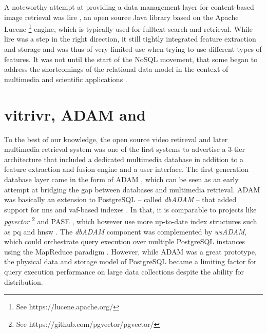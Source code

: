 A noteworthy attempt at providing a data management layer for content-based image retrieval was \acrfull{lire} \cite{Luc:2008LIRE}, an open source Java library based on the Apache Lucene \footnote{See https://lucene.apache.org/} engine, which is typically used for fulltext search and retrieval. While \acrshort{lire} was a step in the right direction, it still tightly integrated feature extraction and storage and was thus of very limited use when trying to use different types of features. It was not until the start of the NoSQL movement, that some began to address the shortcomings of the relational data model in the context of multimedia and scientific applications \cite{Silva:2010SimDB,Stonebraker:2013SciDB}.

\section{vitrivr, ADAM and \texorpdfstring{\adampro{}}{ADAMpro}}

To the best of our knowledge, the open source \vitrivr{} video retireval \cite{Rossetto:2016vitrivr} and later multimedia retrieval \cite{Gasser:2019Multimodal} system was one of the first systems to advertise a 3-tier architecture that included a dedicated multimedia database in addition to a feature extraction and fusion engine and a user interface. The first generation database layer came in the form of ADAM \cite{Giangreco:2014Adam}, which can be seen as an early attempt at bridging the gap between databases and multimedia retrieval. ADAM was basically an extension to PostgreSQL -- called \emph{dbADAM} -- that added support for \acrshort{nns} and \acrshort{vaf}-based indexes \cite{Weber:1998Va}. In that, it is comparable to projects like \emph{pgvector} \footnote{See https://github.com/pgvector/pgvector/} and PASE \cite{Yang:2020Pase}, which however use more up-to-date index structures such as \acrshort{pq} \cite{Jegou:2010Product} and \acrshort{hnsw} \cite{Malkov:2018Efficient}. The \emph{dbADAM} component was complemented by \emph{wsADAM}, which could orchestrate query execution over multiple PostgreSQL instances using the MapReduce paradigm \cite{Dean:2008Mapreduce}. However, while ADAM was a great prototype, the physical data and storage model of PostgreSQL became a limiting factor for query execution performance on large data collections despite the ability for distribution.


